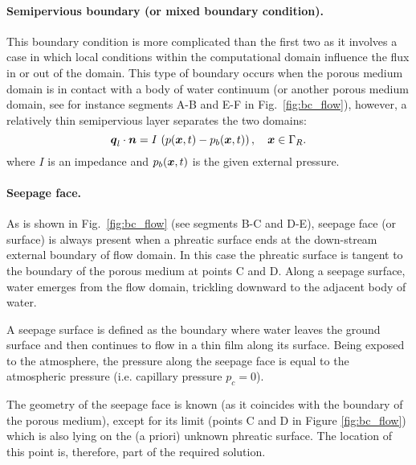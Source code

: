 \paragraph{Semipervious boundary (or mixed boundary condition).}
This boundary condition is more complicated than the first two as it involves a case 
in which local conditions within the computational domain influence the flux in or 
out of the domain.
This type of boundary occurs when the porous medium domain is in contact with 
a body of water continuum (or another porous medium domain, see for instance segments 
A-B and E-F in Fig.~\ref{fig:bc_flow}), however, a relatively thin semipervious layer 
separates the two domains:
\begin{equation}
\label{eq:BC semipervious Darcy PS thermal}
  {\boldsymbol{q}}_l \cdot \boldsymbol{n} = I\, \left(p ({\boldsymbol{x}},t) - p_{b}({\boldsymbol{x}},t) \right), \quad {\boldsymbol{x}} \in \Gamma_R.
\end{equation}
where $I$ is an impedance and $p_{b}({\boldsymbol{x}},t)$ is the given external pressure.

\paragraph{Seepage face.}
As is shown in Fig.~\ref{fig:bc_flow} (see segments B-C and D-E), seepage face (or surface) 
is always present when a phreatic surface ends at the down-stream external boundary of flow domain.
In this case the phreatic surface is tangent to the boundary of the porous medium at points C and D.
Along a seepage surface, water emerges from the flow domain, trickling downward to the adjacent body of water.

A seepage surface is defined as the boundary 
where water leaves the ground surface and then continues to flow in a thin film along its surface.
Being exposed to the atmosphere, the pressure along the seepage face is equal to the atmospheric pressure 
(i.e. capillary pressure $p_{c}=0$). 

The geometry of the seepage face is known (as it coincides with the boundary of the porous medium), 
except for its limit (points C and D in Figure \ref{fig:bc_flow}) 
which is also lying on the (a priori) unknown phreatic surface.
The location of this point is, therefore, part of the required solution.



